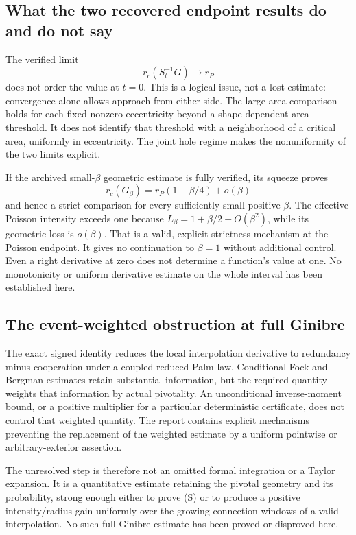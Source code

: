 \documentclass[11pt,a4paper]{article}
\theoremstyle{definition}
\theoremstyle{remark}
\numberwithin{equation}{section}
\begin{document}
\subsection{What the two recovered endpoint results do and do not say}
The verified limit
\[
          r_c(S_t^{-1}G)\longrightarrow r_P
\]
does not order the value at \(t=0\). This is a logical issue, not a lost
estimate: convergence alone allows approach from either side. The
large-area comparison holds for each fixed nonzero eccentricity beyond
a shape-dependent area threshold. It does not identify that threshold
with a neighborhood of a critical area, uniformly in eccentricity.
The joint hole regime makes the nonuniformity of the two limits explicit.

If the archived small-\(\beta\) geometric estimate is fully verified, its
squeeze proves
\[
 r_c(G_\beta)=r_P(1-\beta/4)+o(\beta)
\]
and hence a strict comparison for every sufficiently small positive
\(\beta\). The effective Poisson intensity exceeds one because
\(L_\beta=1+\beta/2+O(\beta^2)\), while its geometric loss is
\(o(\beta)\). That is a valid, explicit strictness mechanism at the
Poisson endpoint. It gives no continuation to \(\beta=1\) without
additional control. Even a right derivative at zero does not determine
a function's value at one. No monotonicity or uniform derivative estimate
on the whole interval has been established here.

\subsection{The event-weighted obstruction at full Ginibre}
The exact signed identity reduces the local interpolation derivative to
redundancy minus cooperation under a coupled reduced Palm law. Conditional
Fock and Bergman estimates retain substantial information, but the required
quantity weights that information by actual pivotality. An unconditional
inverse-moment bound, or a positive multiplier for a particular deterministic
certificate, does not control that weighted quantity. The report contains
explicit mechanisms preventing the replacement of the weighted estimate
by a uniform pointwise or arbitrary-exterior assertion.

The unresolved step is therefore not an omitted formal integration or a
Taylor expansion. It is a quantitative estimate retaining the pivotal
geometry and its probability, strong enough either to prove (S) or to
produce a positive intensity/radius gain uniformly over the growing
connection windows of a valid interpolation. No such full-Ginibre estimate
has been proved or disproved here.
\end{document}
